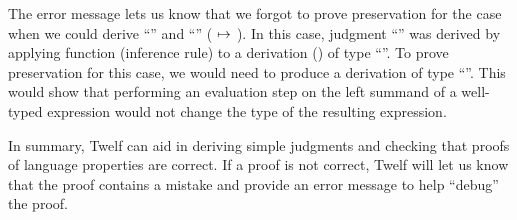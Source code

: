 The error message lets us know that we forgot to prove preservation
for the case when we could derive ``''
and ``''
( $\mapsto$ ).
In this case, judgment ``''
was derived by applying function (inference rule) 
to a derivation () of type ``''.
To prove preservation for this case,
we would need to produce a derivation of type ``''.
This would show that performing an evaluation step on the left
summand of a well-typed  expression would not change
the type of the resulting  expression.

In summary, Twelf can aid in deriving simple judgments and checking
that proofs of language properties are correct.
If a proof is not correct, Twelf will let us know that the proof
contains a mistake and provide an error message to help ``debug'' the proof.
